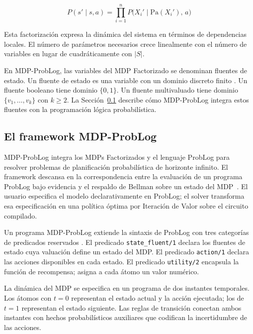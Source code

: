 \begin{equation}
  P(s' \mid s, a) = \prod_{i=1}^{n} P\bigl(X_i' \mid \text{Pa}(X_i'),\, a\bigr)
  \label{eq:factored-transition}
\end{equation}

Esta factorización expresa la dinámica del sistema en términos de dependencias locales. El número de parámetros necesarios crece linealmente con el número de variables en lugar de cuadráticamente con $|S|$.

En MDP-ProbLog, las variables del MDP Factorizado se denominan fluentes de estado. Un fluente de estado es una variable con un dominio discreto finito \cite{bueno2016mdp}. Un fluente booleano tiene dominio $\{0, 1\}$. Un fluente multivaluado tiene dominio $\{v_1, \ldots, v_k\}$ con $k \geq 2$.  La Sección~\ref{sec:mt-mdpproblog} describe cómo MDP-ProbLog integra estos fluentes con la programación lógica probabilística.

\subsection{El framework MDP-ProbLog}
\label{sec:mt-mdpproblog}

MDP-ProbLog integra los MDPs Factorizados y el lenguaje ProbLog para resolver problemas de planificación probabilística de horizonte infinito. El framework descansa en la correspondencia entre la evaluación de un programa ProbLog bajo evidencia y el respaldo de Bellman sobre un estado del MDP~\cite{bueno2016mdp}. El usuario especifica el modelo declarativamente en ProbLog; el solver transforma esa especificación en una política óptima por Iteración de Valor sobre el circuito compilado.

Un programa MDP-ProbLog extiende la sintaxis de ProbLog con tres categorías de predicados reservados \cite{bueno2016mdp}. El predicado \texttt{state\_fluent/1} declara los fluentes de estado cuya valuación define un estado del MDP. El predicado \texttt{action/1} declara las acciones disponibles en cada estado. El predicado \texttt{utility/2} encapsula la función de recompensa; asigna a cada átomo un valor numérico.

La dinámica del MDP se especifica en un programa de dos instantes temporales. Los átomos con $t = 0$ representan el estado actual y la acción ejecutada; los de $t = 1$ representan el estado siguiente. Las reglas de transición conectan ambos instantes con hechos probabilísticos auxiliares que codifican la incertidumbre de las acciones.

